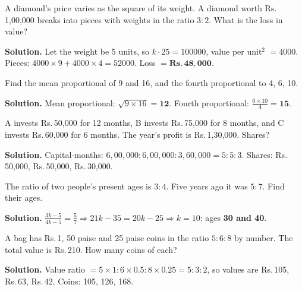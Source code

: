 \documentclass[11pt,a4paper,openany]{report}
\newcommand{\Rs}{Rs.\,}
\begin{document}
\begin{example}
A diamond's price varies as the square of its weight. A diamond worth \Rs1,00,000 breaks into pieces with weights in the ratio $3:2$. What is the loss in value?

\textbf{Solution.} Let the weight be 5 units, so $k\cdot25=100000$, value per unit$^2$ $=4000$. Pieces: $4000\times9+4000\times4=52000$. Loss $=\mathbf{\Rs48,000}$.
\end{example}

\begin{example}
Find the mean proportional of 9 and 16, and the fourth proportional to 4, 6, 10.

\textbf{Solution.} Mean proportional: $\sqrt{9\times16}=\mathbf{12}$. Fourth proportional: $\frac{6\times10}4=\mathbf{15}$.
\end{example}
\begin{example}[partnership]
A invests \Rs50,000 for 12 months, B invests \Rs75,000 for 8 months, and C invests \Rs60,000 for 6 months. The
year's profit is \Rs1,30,000. Shares?

\textbf{Solution.} Capital-months: $6,00,000 : 6,00,000 : 3,60,000=5:5:3$. Shares: \Rs50,000, \Rs50,000, \Rs30,000.
\end{example}

\begin{example}[ages]
The ratio of two people's present ages is $3:4$. Five years ago it was $5:7$. Find their ages.

\textbf{Solution.} $\frac{3k-5}{4k-5}=\frac57\Rightarrow21k-35=20k-25\Rightarrow k=10$: ages \textbf{30 and 40}.
\end{example}

\begin{example}[coins]
A bag has \Rs1, 50 paise and 25 paise coins in the ratio $5:6:8$ by number. The total value is \Rs210. How many coins of each?

\textbf{Solution.} Value ratio $=5\times1:6\times0.5:8\times0.25=5:3:2$, so values are \Rs105, \Rs63, \Rs42.
Coins: 105, 126, 168.
\end{example}
\end{document}
